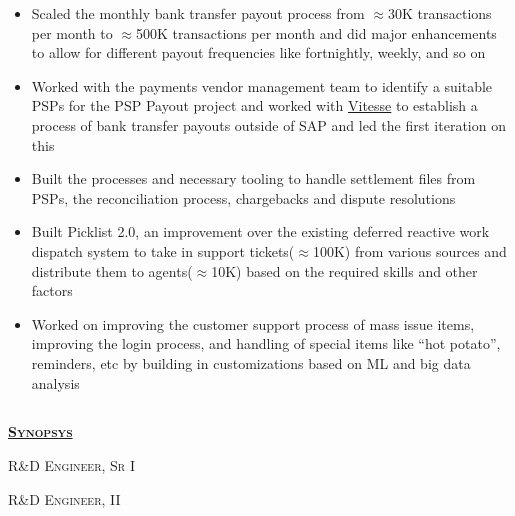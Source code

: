\documentclass{article}
\begin{document}
\begin{itemize}[noitemsep,nolistsep]
\item Scaled the monthly bank transfer payout process from $\approx$30K transactions per month to $\approx$500K transactions per month and did major enhancements to allow for different payout frequencies like fortnightly, weekly, and so on
\item Worked with the payments vendor management team to identify a suitable PSPs for the PSP Payout project and worked with \href{https://vitessepsp.com/}{Vitesse} to establish a process of bank transfer payouts outside of SAP and led the first iteration on this
\item Built the processes and necessary tooling to handle settlement files from PSPs, the reconciliation process, chargebacks and dispute resolutions
\item Built Picklist 2.0, an improvement over the existing deferred reactive work dispatch system to take in support tickets($\approx$100K) from various sources and distribute them to agents($\approx$10K) based on the required skills and other factors
\item Worked on improving the customer support process of mass issue items, improving the login process, and handling of special items like “hot potato”, reminders, etc by building in customizations based on ML and big data analysis
\end{itemize}

\subsection[Synopsys]{}

{\raggedright{\textsc{\textbf{\href{https://www.synopsys.com/}{Synopsys}}}}} \hfill {}

{\raggedright{\textsc{R\&D Engineer, Sr I}}} \hfill {}

{\raggedright{\textsc{R\&D Engineer, II}}} \hfill {}
\end{document}
